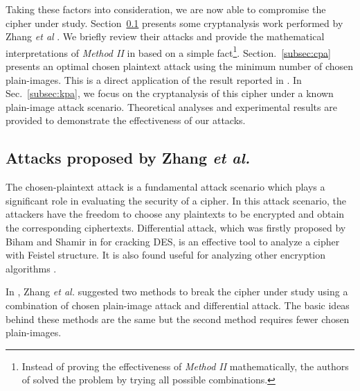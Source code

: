 \documentclass[smallextended, final]{svjour3}          \smartqed
\begin{document}
Taking these factors into consideration, we are now able to compromise the cipher under study.
Section~\ref{subsec:yushuidea} presents some cryptanalysis work performed by Zhang \textit{et al} \cite{zhang2014cryptanalysis}. We briefly review their attacks and
provide the mathematical interpretations of \textit{Method II} in \cite[Sec.~3.2]{zhang2014cryptanalysis} based on a simple
fact\footnote{Instead of proving the effectiveness of \textit{Method II} mathematically, the authors of \cite{zhang2014cryptanalysis} solved the problem by trying all possible combinations.}.
Section.~\ref{subsec:cpa} presents an optimal chosen plaintext attack using the minimum number of chosen plain-images.
This is a direct application of the result reported in \cite{li2008general, li2011optimal}.
In Sec.~\ref{subsec:kpa}, we focus on the cryptanalysis of this cipher under a known plain-image attack scenario.
Theoretical analyses and experimental results are provided to demonstrate the effectiveness of our attacks.

\subsection{Attacks proposed by Zhang \textit{et al.} }
\label{subsec:yushuidea}
The chosen-plaintext attack is a fundamental attack scenario which plays a significant role in evaluating the security of a cipher.
In this attack scenario, the attackers have the freedom to choose any plaintexts
to be encrypted and obtain the corresponding ciphertexts. Differential attack, which was firstly proposed by Biham and Shamir in \cite{Biham:Deslike:Crypt90} for cracking DES, is an
effective tool to analyze a cipher with Feistel structure. It is also found useful for analyzing other encryption algorithms \cite{li2012breaking,zhang2012cryptanalyzing}.

In \cite{zhang2014cryptanalysis}, Zhang \textit{et al.} suggested two methods to break the cipher under study using a combination of
chosen plain-image attack and differential attack. The basic ideas behind these methods are the same but the second method requires fewer
chosen plain-images.
\end{document}
